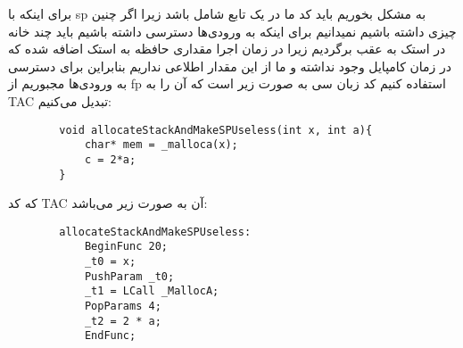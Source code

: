 
برای اینکه با sp به مشکل بخوریم باید کد ما در یک تابع شامل  باشد زیرا اگر چنین چیزی داشته باشیم نمیدانیم برای اینکه به ورودی‌ها دسترسی داشته باشیم باید چند خانه در استک به عقب برگردیم زیرا در زمان اجرا مقداری حافظه به استک اضافه شده که در زمان کامپایل وجود نداشته و ما از این مقدار اطلاعی نداریم بنابراین برای دسترسی به ورودی‌ها مجبوریم از fp استفاده کنیم کد زبان سی به صورت زیر است که آن را به TAC تبدیل می‌کنیم:
\begin{latin}
	\begin{verbatim}
		void allocateStackAndMakeSPUseless(int x, int a){
		    char* mem = _malloca(x);
		    c = 2*a;
		}
	\end{verbatim}
\end{latin}
که کد TAC آن به صورت زیر می‌باشد:
\begin{latin}
	\begin{verbatim}
		allocateStackAndMakeSPUseless:
		    BeginFunc 20;
		    _t0 = x;
		    PushParam _t0;
		    _t1 = LCall _MallocA;
		    PopParams 4;
		    _t2 = 2 * a;
		    EndFunc;
			
	\end{verbatim}
\end{latin}